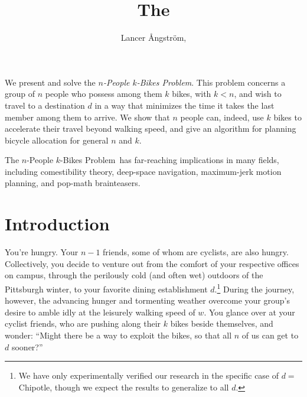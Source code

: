 \documentclass[DIV=calc, paper=a4, fontsize=11pt, twocolumn]{scrartcl}	 %
\title{The \Prob} %
\author{Lancer \r{A}ngstr\"{o}m, } %
\date{} %
\newcommand{\initial}[1]{ %
\lettrine[lines=3,lhang=0.3,nindent=0em]{
\color{DarkGoldenrod}
{\textsf{#1}}}{}}
\newcommand\prob{$n$-People $k$-Bikes Problem}
\begin{document}
\maketitle %

\thispagestyle{fancy} %



\initial{W}e present and solve the {\em \prob}. This problem concerns a group of $n$ people who possess among them $k$ bikes, with $k<n$, and wish to travel to a destination $d$ in a way that minimizes the time it takes the last member among them to arrive. We show that $n$ people can, indeed, use $k$ bikes to accelerate their travel beyond walking speed, and give an algorithm for planning bicycle allocation for general $n$ and $k$.

The \prob~has far-reaching implications in many fields, including comestibility theory, deep-space navigation, maximum-jerk motion planning, and pop-math brainteasers.


\section{Introduction}

\initial{Y}ou're hungry. Your $n-1$ friends, some of whom are cyclists, are also hungry. Collectively, you decide to venture out from the comfort of your respective offices on campus, through the perilously cold (and often wet) outdoors of the Pittsburgh winter, to your favorite dining establishment $d$.\footnote{
We have only experimentally verified our research in the specific case of $d =$ {\sf Chipotle}, though we expect the results to generalize to all $d$.}
During the journey, however, the advancing hunger and tormenting weather overcome your group's desire to amble idly at the leisurely walking speed of $w$.
You glance over at your cyclist friends, who are pushing along their $k$ bikes beside themselves, and wonder: ``Might there be a way to exploit the bikes, so that all $n$ of us can get to $d$ sooner?''
\end{document}
